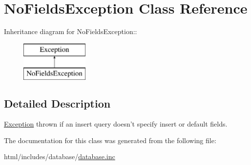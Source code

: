 \hypertarget{classNoFieldsException}{
\section{NoFieldsException Class Reference}
\label{classNoFieldsException}
}
Inheritance diagram for NoFieldsException::\begin{figure}[H]
\begin{center}
\leavevmode
\includegraphics[height=2cm]{classNoFieldsException}
\end{center}
\end{figure}


\subsection{Detailed Description}
\hyperlink{classException}{Exception} thrown if an insert query doesn't specify insert or default fields. 

The documentation for this class was generated from the following file:\begin{DoxyCompactItemize}
\item 
html/includes/database/\hyperlink{database_8inc}{database.inc}\end{DoxyCompactItemize}
